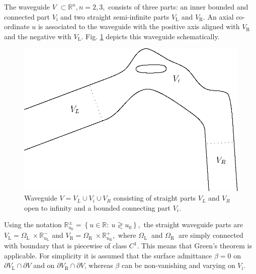 \documentclass[numreferences]{kluwer}
\begin{document}
The waveguide $V$ $\subset\mathbb{R}^{n},n=2,3,$ consists of three
parts: an inner bounded and connected part $V_{\text{i}}$ and two
straight semi-infinite parts $V_{\text{L}}$ and $V_{\text{R}}$. An
axial co-ordinate $u$ is associated to the waveguide with the positive
axis aligned with $V_{\text{R}}$ and the negative with $V_{\text{L}}.$
Fig.  \ref{fig:wg1} depicts this waveguide schematically.%
\begin{figure}[htb]
  \centering
  \includegraphics[scale=1]{waveguide-1}
  \caption{Waveguide $V=V_L\cup V_i\cup V_R$ consisting of straight
    parts $V_L$ and $V_R$ open to infinity and a bounded connecting
    part $V_i$.}
  \label{fig:wg1}
\end{figure}
Using the notation $\mathbb{R}_{u_0}^{\pm}=\left\{ u\in\mathbb{R}:\
  u\gtrless u_{0}\right\} ,$ the straight waveguide parts are
$V_{\text{L}%
}=\Omega_{\text{L }}\times\mathbb{R}_{u_{\text{L}}}^{-}$ and
$V_{\text{R}%
}=\Omega_{\text{R }}\times\mathbb{R}_{u_{\text{R}}}^{+},$ where
$\Omega _{\text{L }}$ and $\Omega_{\text{R }}$ are simply connected
with boundary that is piecewise of class $C^{1}.$ This means that
Green's theorem is applicable.  For simplicity it is assumed that the
surface admittance $\beta=0$ on $\partial V_{\text{L}}\cap\partial V$
and on $\partial V_{\text{R}}\cap\partial V$, whereas $\beta$ can be
non-vanishing and varying on $V_{\text{i}}.$
\end{document}
